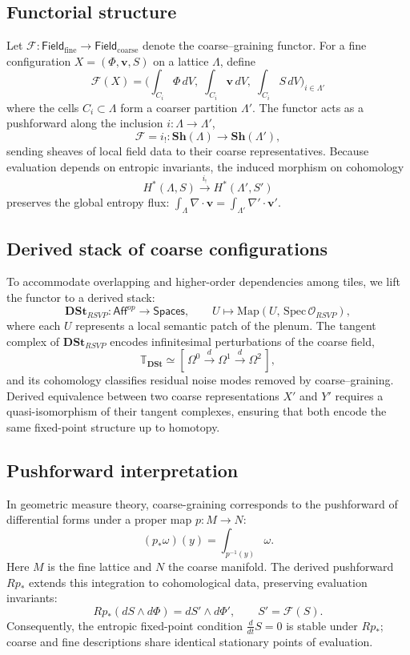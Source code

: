 \documentclass[12pt,a4paper]{article}
\newcommand{\RSVP}{RSVP}              %
\newcommand{\ddt}{\tfrac{d}{dt}}      %
\theoremstyle{plain}
\begin{document}
\subsection{Functorial structure}
Let \(\mathcal{F}:\mathsf{Field}_\text{fine}\to\mathsf{Field}_\text{coarse}\) denote the coarse--graining functor.  
For a fine configuration \(X=(\Phi,\mathbf{v},S)\) on a lattice \(\Lambda\), define
\[
\mathcal{F}(X)
   = \bigl(\!\int_{C_i}\!\Phi\,dV,\;
            \int_{C_i}\!\mathbf{v}\,dV,\;
            \int_{C_i}\!S\,dV \bigr)_{i\in\Lambda'}
\]
where the cells \(C_i\subset\Lambda\) form a coarser partition \(\Lambda'\).  
The functor acts as a pushforward along the inclusion \(i:\Lambda\to\Lambda'\),
\[
\mathcal{F} = i_!: \mathbf{Sh}(\Lambda)\longrightarrow \mathbf{Sh}(\Lambda'),
\]
sending sheaves of local field data to their coarse representatives.  
Because evaluation depends on entropic invariants, the induced morphism on cohomology
\[
H^*(\Lambda,S)\xrightarrow{i_!}H^*(\Lambda',S')
\]
preserves the global entropy flux:
\(\int_\Lambda \nabla\!\cdot\!\mathbf{v} = \int_{\Lambda'} \nabla'\!\cdot\!\mathbf{v}'\).

\subsection{Derived stack of coarse configurations}
To accommodate overlapping and higher-order dependencies among tiles, we lift the functor to a derived stack:
\[
\mathbf{DSt}_{\RSVP}:\mathsf{Aff}^{op}\!\to\!\mathsf{Spaces},\qquad
U\mapsto \mathrm{Map}(U,\,\text{Spec}\,\mathcal{O}_{\RSVP}),
\]
where each \(U\) represents a local semantic patch of the plenum.
The tangent complex of \(\mathbf{DSt}_{\RSVP}\) encodes infinitesimal perturbations of the coarse field,
\[
\mathbb{T}_{\mathbf{DSt}} \simeq 
   [\,\Omega^0\xrightarrow{d}\Omega^1\xrightarrow{d}\Omega^2\,],
\]
and its cohomology classifies residual noise modes removed by coarse--graining.
Derived equivalence between two coarse representations \(X'\) and \(Y'\)
requires a quasi-isomorphism of their tangent complexes,
ensuring that both encode the same fixed-point structure up to homotopy.

\subsection{Pushforward interpretation}
In geometric measure theory, coarse-graining corresponds to the pushforward of differential forms under a proper map \(p:M\to N\):
\[
(p_*\omega)(y) = \int_{p^{-1}(y)}\!\omega.
\]
Here \(M\) is the fine lattice and \(N\) the coarse manifold.
The derived pushforward \(Rp_*\) extends this integration to cohomological data,
preserving evaluation invariants:
\[
Rp_*\!\left(dS\wedge d\Phi\right)
   = dS'\wedge d\Phi',
   \qquad S'=\mathcal{F}(S).
\]
Consequently, the entropic fixed-point condition
\(\ddt S=0\)
is stable under \(Rp_*\); 
coarse and fine descriptions share identical stationary points of evaluation.
\end{document}
